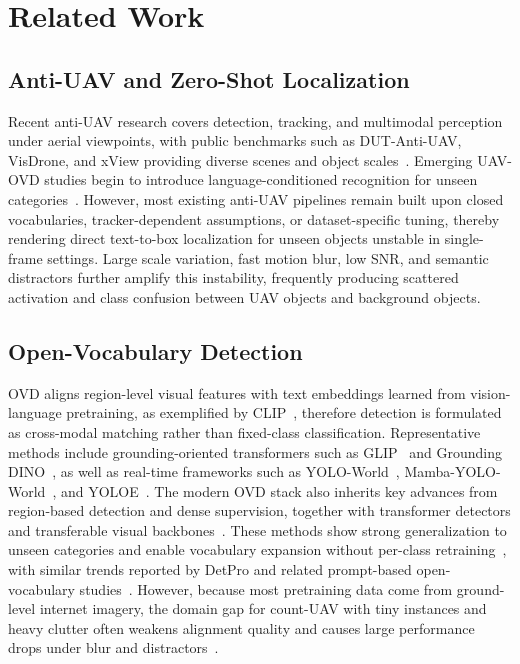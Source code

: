 \documentclass[letterpaper, 10 pt, conference]{ieeeconf}  %
\begin{document}
\section{Related Work}
\label{sec:related}

\subsection{Anti-UAV and Zero-Shot Localization}
Recent anti-UAV research covers detection, tracking, and multimodal perception under aerial viewpoints, with public benchmarks such as DUT-Anti-UAV, VisDrone, and xView providing diverse scenes and object scales~\cite{zhao2022dutantiuav,zhu2019visdrone,lam2018xview}. Emerging UAV-OVD studies begin to introduce language-conditioned recognition for unseen categories~\cite{cheng2024yoloworld,wang2025mambayoloworld,wang2025yoloe,liu2024groundingdino}. However, most existing anti-UAV pipelines remain built upon closed vocabularies, tracker-dependent assumptions, or dataset-specific tuning, thereby rendering direct text-to-box localization for unseen objects unstable in single-frame settings. Large scale variation, fast motion blur, low SNR, and semantic distractors further amplify this instability, frequently producing scattered activation and class confusion between UAV objects and background objects.

\subsection{Open-Vocabulary Detection}
OVD aligns region-level visual features with text embeddings learned from vision-language pretraining, as exemplified by CLIP~\cite{radford2021clip}, therefore detection is formulated as cross-modal matching rather than fixed-class classification. Representative methods include grounding-oriented transformers such as GLIP~\cite{li2022glip} and Grounding DINO~\cite{liu2024groundingdino}, as well as real-time frameworks such as YOLO-World~\cite{cheng2024yoloworld}, Mamba-YOLO-World~\cite{wang2025mambayoloworld}, and YOLOE~\cite{wang2025yoloe}. The modern OVD stack also inherits key advances from region-based detection and dense supervision, together with transformer detectors and transferable visual backbones~\cite{liu2021swin,carion2020detr}. These methods show strong generalization to unseen categories and enable vocabulary expansion without per-class retraining~\cite{gu2022vild,minderer2022owlvit}, with similar trends reported by DetPro and related prompt-based open-vocabulary studies~\cite{du2022detpro}. However, because most pretraining data come from ground-level internet imagery, the domain gap for count-UAV with tiny instances and heavy clutter often weakens alignment quality and causes large performance drops under blur and distractors~\cite{zhong2022regionclip}.
\end{document}
